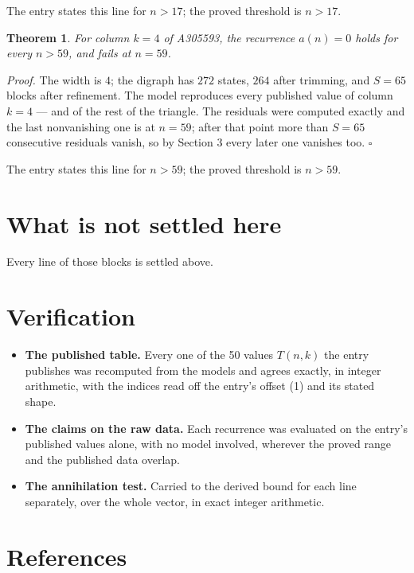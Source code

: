 \documentclass[11pt]{article}
\newtheorem{theorem}{Theorem}
\theoremstyle{definition}
\begin{document}
The entry states this line for $n > 17$; the proved threshold is $n > 17$.

\begin{theorem} For column $k = 4$ of A305593, the recurrence $a(n) = 0$ holds for every $n > 59$, and fails at $n = 59$.\end{theorem}

{\itshape Proof.} The width is $4$; the digraph has $272$ states, $264$ after trimming, and $S = 65$ blocks after refinement. The model reproduces every published value of column $k = 4$ --- and of the rest of the triangle. The residuals were computed exactly and the last nonvanishing one is at $n = 59$; after that point more than $S = 65$ consecutive residuals vanish, so by Section 3 every later one vanishes too. $\square$

The entry states this line for $n > 59$; the proved threshold is $n > 59$.

\section{What is not settled here}

Every line of those blocks is settled above.

\section{Verification}

\begin{itemize}

\item {\bfseries The published table.} Every one of the 50 values $T(n,k)$ the entry publishes was recomputed from the models and agrees exactly, in integer arithmetic, with the indices read off the entry's offset (1) and its stated shape.

\item {\bfseries The claims on the raw data.} Each recurrence was evaluated on the entry's published values alone, with no model involved, wherever the proved range and the published data overlap.

\item {\bfseries The annihilation test.} Carried to the derived bound for each line separately, over the whole vector, in exact integer arithmetic.

\end{itemize}

\section{References}
\end{document}
